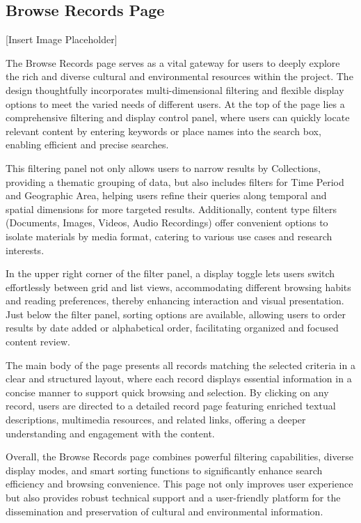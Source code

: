 \subsection{Browse Records Page}
[Insert Image Placeholder]

The Browse Records page serves as a vital gateway for users to deeply explore the rich and diverse cultural and environmental resources within the project. The design thoughtfully incorporates multi-dimensional filtering and flexible display options to meet the varied needs of different users. At the top of the page lies a comprehensive filtering and display control panel, where users can quickly locate relevant content by entering keywords or place names into the search box, enabling efficient and precise searches.

This filtering panel not only allows users to narrow results by Collections, providing a thematic grouping of data, but also includes filters for Time Period and Geographic Area, helping users refine their queries along temporal and spatial dimensions for more targeted results. Additionally, content type filters (Documents, Images, Videos, Audio Recordings) offer convenient options to isolate materials by media format, catering to various use cases and research interests.

In the upper right corner of the filter panel, a display toggle lets users switch effortlessly between grid and list views, accommodating different browsing habits and reading preferences, thereby enhancing interaction and visual presentation. Just below the filter panel, sorting options are available, allowing users to order results by date added or alphabetical order, facilitating organized and focused content review.

The main body of the page presents all records matching the selected criteria in a clear and structured layout, where each record displays essential information in a concise manner to support quick browsing and selection. By clicking on any record, users are directed to a detailed record page featuring enriched textual descriptions, multimedia resources, and related links, offering a deeper understanding and engagement with the content.

Overall, the Browse Records page combines powerful filtering capabilities, diverse display modes, and smart sorting functions to significantly enhance search efficiency and browsing convenience. This page not only improves user experience but also provides robust technical support and a user-friendly platform for the dissemination and preservation of cultural and environmental information.

